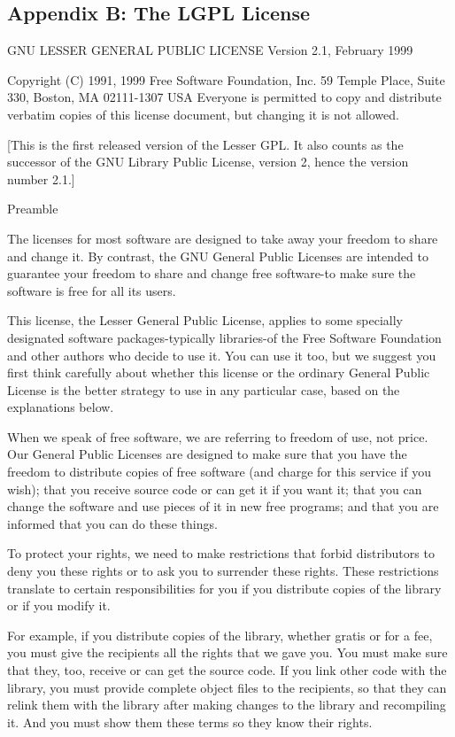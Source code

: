 \subsection*{Appendix B\+: The L\+G\+PL License }


\begin{DoxyCode}
GNU LESSER GENERAL PUBLIC LICENSE
Version 2.1, February 1999

 Copyright (C) 1991, 1999 Free Software Foundation, Inc.
     59 Temple Place, Suite 330, Boston, MA  02111-1307  USA
 Everyone is permitted to copy and distribute verbatim copies
 of this license document, but changing it is not allowed.

[This is the first released version of the Lesser GPL.  It also counts
 as the successor of the GNU Library Public License, version 2, hence
 the version number 2.1.]

Preamble

  The licenses for most software are designed to take away your
freedom to share and change it.  By contrast, the GNU General Public
Licenses are intended to guarantee your freedom to share and change
free software-to make sure the software is free for all its users.

  This license, the Lesser General Public License, applies to some
specially designated software packages-typically libraries-of the
Free Software Foundation and other authors who decide to use it.  You
can use it too, but we suggest you first think carefully about whether
this license or the ordinary General Public License is the better
strategy to use in any particular case, based on the explanations below.

  When we speak of free software, we are referring to freedom of use,
not price.  Our General Public Licenses are designed to make sure that
you have the freedom to distribute copies of free software (and charge
for this service if you wish); that you receive source code or can get
it if you want it; that you can change the software and use pieces of
it in new free programs; and that you are informed that you can do
these things.

  To protect your rights, we need to make restrictions that forbid
distributors to deny you these rights or to ask you to surrender these
rights.  These restrictions translate to certain responsibilities for
you if you distribute copies of the library or if you modify it.

  For example, if you distribute copies of the library, whether gratis
or for a fee, you must give the recipients all the rights that we gave
you.  You must make sure that they, too, receive or can get the source
code.  If you link other code with the library, you must provide
complete object files to the recipients, so that they can relink them
with the library after making changes to the library and recompiling
it.  And you must show them these terms so they know their rights.


\end{DoxyCode}
